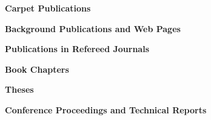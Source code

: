 \documentclass[11pt, tightenlines]{revtex4}
\begin{document}
{\LARGE\bf Carpet Publications}



\hrulefill

{\large\bf Background Publications and Web Pages}

\begin{enumerate}
  
  
\end{enumerate}



\hrulefill

{\large\bf Publications in Refereed Journals}

\begin{enumerate}
  
\end{enumerate}



\hrulefill

{\large\bf Book Chapters}

\begin{enumerate}
  
\end{enumerate}



\hrulefill

{\large\bf Theses}

\begin{enumerate}
  
\end{enumerate}



\hrulefill

{\large\bf Conference Proceedings and Technical Reports}

\begin{enumerate}
  
\end{enumerate}
\end{document}
